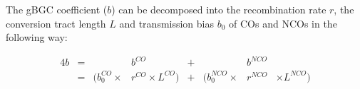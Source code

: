 The gBGC coefficient ($b$) can be decomposed into the recombination rate $r$, the conversion tract length $L$ and transmission bias $b_0$ of COs and NCOs in the following way:

\begin{alignat*}{4}
	    b&={}&                     &b^{CO}                   &{}+{}&                      &b^{NCO}& \\
	     &={}& ( b_{0}^{CO} \times &r^{CO} \times L^{CO}  )  &{}+{}& ( b_{0}^{NCO} \times &r^{NCO}& \times L^{NCO}  )
\end{alignat*}



